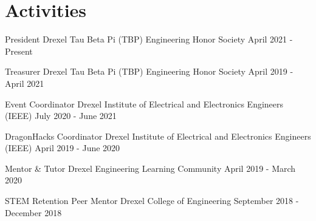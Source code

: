 \section{Activities}

\activity
  {President}
  {Drexel Tau Beta Pi (TBP) Engineering Honor Society}
  {April 2021 - Present}

\activity
  {Treasurer}
  {Drexel Tau Beta Pi (TBP) Engineering Honor Society}
  {April 2019 - April 2021}

\activity
  {Event Coordinator}
  {Drexel Institute of Electrical and Electronics Engineers (IEEE)}
  {July 2020 - June 2021}

\activity
  {DragonHacks Coordinator}
  {Drexel Institute of Electrical and Electronics Engineers (IEEE)}
  {April 2019 - June 2020}

\activity
  {Mentor \& Tutor}
  {Drexel Engineering Learning Community}
  {April 2019 - March 2020}

\activity
  {STEM Retention Peer Mentor}
  {Drexel College of Engineering}
  {September 2018 - December 2018}
